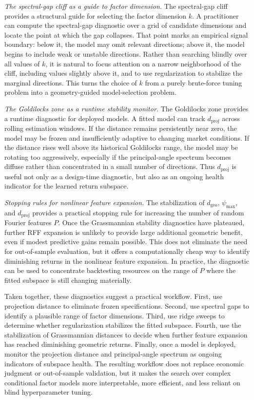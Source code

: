 \documentclass[11pt,letterpaper]{article}
\begin{document}
\smallskip\noindent
\textit{The spectral-gap cliff as a guide to factor dimension.} The spectral-gap cliff provides a structural guide for selecting the factor dimension $k$. A practitioner can compute the spectral-gap diagnostic over a grid of candidate dimensions and locate the point at which the gap collapses. That point marks an empirical signal boundary: below it, the model may omit relevant directions; above it, the model begins to include weak or unstable directions. Rather than searching blindly over all values of $k$, it is natural to focus attention on a narrow neighborhood of the cliff, including values slightly above it, and to use regularization to stabilize the marginal directions. This turns the choice of $k$ from a purely brute-force tuning problem into a geometry-guided model-selection problem.

\smallskip\noindent
\textit{The Goldilocks zone as a runtime stability monitor.} The Goldilocks zone provides a runtime diagnostic for deployed models. A fitted model can track $d_{\mathrm{proj}}$ across rolling estimation windows. If the distance remains persistently near zero, the model may be frozen and insufficiently adaptive to changing market conditions. If the distance rises well above its historical Goldilocks range, the model may be rotating too aggressively, especially if the principal-angle spectrum becomes diffuse rather than concentrated in a small number of directions. Thus $d_{\mathrm{proj}}$ is useful not only as a design-time diagnostic, but also as an ongoing health indicator for the learned return subspace.

\smallskip\noindent
\textit{Stopping rules for nonlinear feature expansion.} The stabilization of $d_{\mathrm{geo}}$, $\psi_{\max}$, and $d_{\mathrm{proj}}$ provides a practical stopping rule for increasing the number of random Fourier features $P$. Once the Grassmannian stability diagnostics have plateaued, further RFF expansion is unlikely to provide large additional geometric benefit, even if modest predictive gains remain possible. This does not eliminate the need for out-of-sample evaluation, but it offers a computationally cheap way to identify diminishing returns in the nonlinear feature expansion. In practice, the diagnostic can be used to concentrate
backtesting resources on the range of $P$ where the fitted subspace is still changing materially.

\smallskip\noindent
Taken together, these diagnostics suggest a practical workflow. First, use projection distance to eliminate frozen specifications. Second, use spectral gaps to identify a plausible range of factor dimensions. Third, use ridge sweeps to determine whether regularization stabilizes the fitted subspace. Fourth, use the stabilization of Grassmannian distances to decide when further feature expansion has reached diminishing geometric returns. Finally, once a model is deployed, monitor the projection distance and principal-angle spectrum as ongoing indicators of subspace health. The resulting workflow does not replace economic judgment or out-of-sample validation, but it makes the search over complex conditional factor models more interpretable, more efficient, and less reliant on blind hyperparameter tuning.
\end{document}
